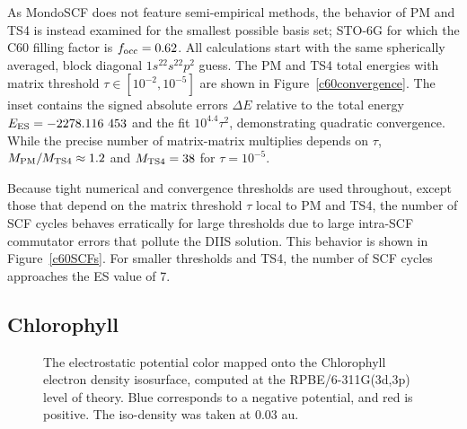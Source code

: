 \commentoutA{\documentclass[prb,aps,twocolumn,twocolumngrid,secnumarabic,superbib,hyperref]{revtex4}}
\begin{document}
As {\sc MondoSCF} does not feature semi-empirical methods, the behavior of PM and TS4 
is instead examined for the smallest possible basis set; STO-6G for which the 
C60 filling factor is $f_{\rm occ}=0.62$. All calculations start with the same spherically 
averaged, block diagonal $1s^22s^22p^2$ guess. The PM and TS4 total 
energies with matrix threshold $\tau \in [10^{-2},10^{-5}]$ are shown in 
Figure~\ref{c60convergence}.  The inset contains the signed absolute errors 
$\Delta E$ relative to the total energy $E_{\rm ES}=-2278.116~453$ and the fit 
$10^{4.4} \tau^2$, demonstrating quadratic convergence. 
While the precise number of matrix-matrix multiplies depends on $\tau$,
$M_{\rm PM}/M_{\rm TS4} \approx 1.2$ and $M_{\rm TS4}=38$ for $\tau=10^{-5}$.

Because tight numerical and convergence thresholds are used throughout, 
except those that depend on the matrix threshold $\tau$ local to {\sc PM} and {\sc TS4},
the number of SCF cycles behaves erratically for large thresholds due to large intra-SCF 
commutator errors that pollute the DIIS solution.  This behavior is shown in 
Figure~\ref{c60SCFs}. For smaller thresholds and TS4, the number of SCF cycles 
approaches the ES value of 7.  

\subsection{Chlorophyll}

\begin{figure}[h]
\caption{The electrostatic potential color mapped onto the Chlorophyll electron density isosurface,
         computed at the RPBE/6-311G(3d,3p) level of theory.  Blue corresponds to a negative potential, 
         and red is positive.  The iso-density was taken at 0.03 au.}\label{ChPic}
\end{figure}
\end{document}
